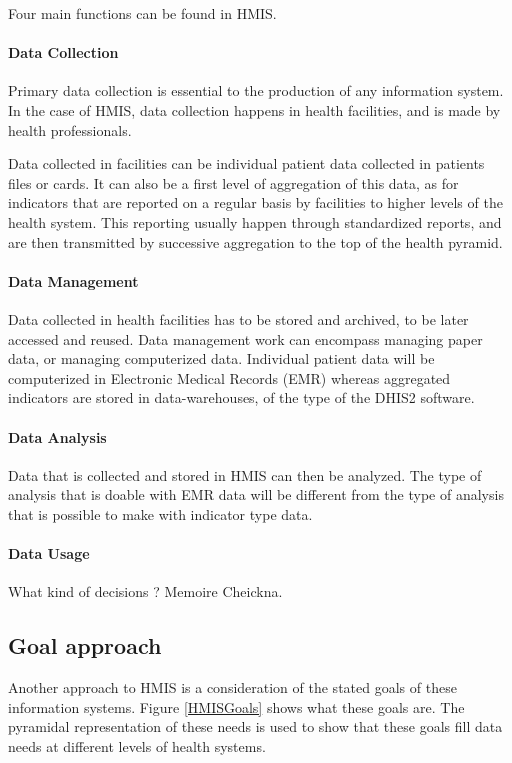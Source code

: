 \documentclass[a4paper,11pt,final,twoside]{article}
\begin{document}
Four main functions can be found in HMIS. 

\paragraph{Data Collection} Primary data collection is essential to the production of any information system. In the case of HMIS, data collection happens in health facilities, and is made by health professionals.

Data collected in facilities can be individual patient data collected in patients files or cards. It can also be a first level of aggregation of this data, as for indicators that are reported on a regular basis by facilities to higher levels of the health system. This reporting usually happen through standardized reports, and are then transmitted by successive aggregation to the top of the health pyramid.

\paragraph{Data Management} Data collected in health facilities has to be stored and archived, to be later accessed and reused. Data management work can encompass managing paper data, or managing computerized data. Individual patient data will be computerized in Electronic Medical Records (EMR) whereas aggregated indicators are stored in data-warehouses, of the type of the DHIS2 software.

\paragraph{Data Analysis} Data that is collected and stored in HMIS can then be analyzed. The type of analysis that is doable with EMR data will be different from the type of analysis that is possible to make with indicator type data. 

\paragraph{Data Usage} What kind of decisions ? Memoire Cheickna.


	\subsection{Goal approach}

Another approach to HMIS is a consideration of the stated goals of these information systems. Figure \ref{HMISGoals} shows what these goals are. The pyramidal representation of these needs is used to show that these goals fill data needs at different levels of health systems.
\end{document}

